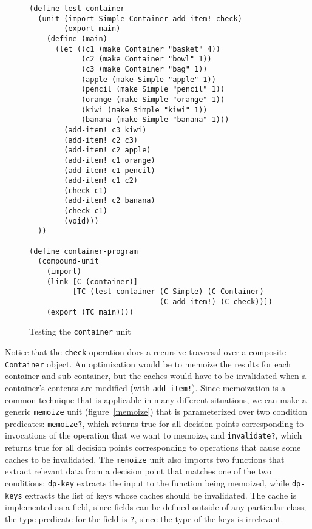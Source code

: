 \documentclass{article}
\newcommand{\code}[1]{\texttt{#1}}
\begin{document}
\begin{figure}
\caption{Testing the \code{container} unit}
\label{test-container}
\begin{verbatim}
(define test-container
  (unit (import Simple Container add-item! check)
        (export main)
    (define (main)
      (let ((c1 (make Container "basket" 4))
            (c2 (make Container "bowl" 1))
            (c3 (make Container "bag" 1))
            (apple (make Simple "apple" 1))
            (pencil (make Simple "pencil" 1))
            (orange (make Simple "orange" 1))
            (kiwi (make Simple "kiwi" 1))
            (banana (make Simple "banana" 1)))
        (add-item! c3 kiwi)
        (add-item! c2 c3)
        (add-item! c2 apple)
        (add-item! c1 orange)
        (add-item! c1 pencil)
        (add-item! c1 c2)
        (check c1)
        (add-item! c2 banana)
        (check c1)
        (void)))
  ))

(define container-program
  (compound-unit
    (import)
    (link [C (container)]
          [TC (test-container (C Simple) (C Container)
                              (C add-item!) (C check))])
    (export (TC main))))
\end{verbatim}
\end{figure}

\pagebreak

Notice that the \code{check} operation does a recursive traversal over
a composite \code{Container} object.  An optimization would be to
memoize the results for each container and sub-container, but the
caches would have to be invalidated when a container's contents are
modified (with \code{add-item!}).  Since memoization is a common
technique that is applicable in many different situations, we can make
a generic \code{memoize} unit (figure~\ref{memoize}) that is
parameterized over two condition predicates: \code{memoize?}, which
returns true for all decision points corresponding to invocations of
the operation that we want to memoize, and \code{invalidate?}, which
returns true for all decision points corresponding to operations that
cause some caches to be invalidated.  The \code{memoize} unit also
imports two functions that extract relevant data from a decision point
that matches one of the two conditions: \code{dp-key} extracts the
input to the function being memoized, while \code{dp-keys} extracts
the list of keys whose caches should be invalidated.  The cache is
implemented as a field, since fields can be defined outside of any
particular class; the type predicate for the field is \code{?}, since
the type of the keys is irrelevant.
\end{document}
